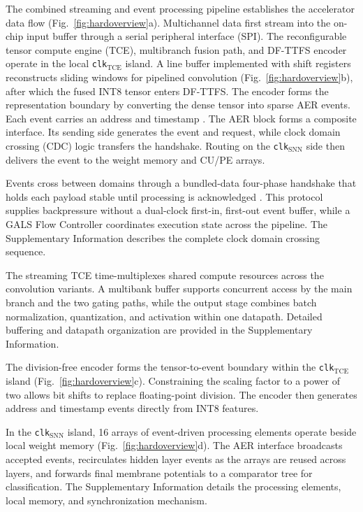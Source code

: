 ﻿\documentclass{nsr}
\begin{document}
The combined streaming and event processing pipeline establishes the accelerator data flow (Fig.~\ref{fig:hardoverview}a). Multichannel data first stream into the on-chip input buffer through a serial peripheral interface (SPI). The reconfigurable tensor compute engine (TCE), multibranch fusion path, and DF-TTFS encoder operate in the local \texttt{clk}$_{\mathrm{TCE}}$ island. A line buffer implemented with shift registers reconstructs sliding windows for pipelined convolution (Fig.~\ref{fig:hardoverview}b), after which the fused INT8 tensor enters DF-TTFS. The encoder forms the representation boundary by converting the dense tensor into sparse AER events. Each event carries an address and timestamp \cite{AER}. The AER block forms a composite interface. Its sending side generates the event and request, while clock domain crossing (CDC) logic transfers the handshake. Routing on the \texttt{clk}$_{\mathrm{SNN}}$ side then delivers the event to the weight memory and CU/PE arrays.

Events cross between domains through a bundled-data four-phase handshake that holds each payload stable until processing is acknowledged \cite{ref72}. This protocol supplies backpressure without a dual-clock first-in, first-out event buffer, while a GALS Flow Controller coordinates execution state across the pipeline. The Supplementary Information describes the complete clock domain crossing sequence.

The streaming TCE time-multiplexes shared compute resources across the convolution variants. A multibank buffer supports concurrent access by the main branch and the two gating paths, while the output stage combines batch normalization, quantization, and activation within one datapath. Detailed buffering and datapath organization are provided in the Supplementary Information.

The division-free encoder forms the tensor-to-event boundary within the \texttt{clk}$_{\mathrm{TCE}}$ island (Fig.~\ref{fig:hardoverview}c). Constraining the scaling factor to a power of two allows bit shifts to replace floating-point division. The encoder then generates address and timestamp events directly from INT8 features.

In the \texttt{clk}$_{\mathrm{SNN}}$ island, 16 arrays of event-driven processing elements operate beside local weight memory (Fig.~\ref{fig:hardoverview}d). The AER interface broadcasts accepted events, recirculates hidden layer events as the arrays are reused across layers, and forwards final membrane potentials to a comparator tree for classification. The Supplementary Information details the processing elements, local memory, and synchronization mechanism.
\end{document}
